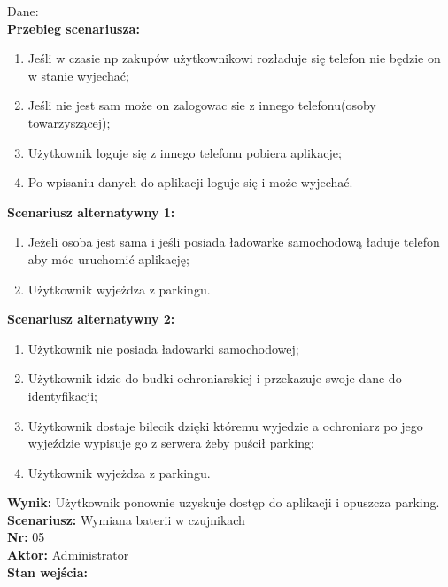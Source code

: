 \documentclass[12pt,a4paper]{article}
\begin{document}
Dane:
\\{\bf Przebieg scenariusza:}
\begin{enumerate}
\item Jeśli w czasie np zakupów użytkownikowi rozładuje się telefon nie będzie on w stanie wyjechać;
\item Jeśli nie jest sam może on zalogowac sie z innego telefonu(osoby towarzyszącej);
\item Użytkownik loguje się z innego telefonu pobiera aplikacje;
\item Po wpisaniu danych do aplikacji loguje się i może wyjechać.
\end{enumerate}
{\bf Scenariusz alternatywny 1:}
\begin{enumerate}
\item Jeżeli osoba jest sama i jeśli posiada ładowarke samochodową ładuje telefon aby móc uruchomić aplikację;
\item Użytkownik wyjeżdza z parkingu.
\end{enumerate}
{\bf Scenariusz alternatywny 2:}
\begin{enumerate}
\item Użytkownik nie posiada ładowarki samochodowej;
\item Użytkownik idzie do budki ochroniarskiej i przekazuje swoje dane do identyfikacji;
\item Użytkownik dostaje bilecik dzięki któremu wyjedzie a ochroniarz po jego wyjeździe wypisuje go z serwera żeby puścił parking;
\item Użytkownik wyjeżdza z parkingu.
\end{enumerate}
{\bf Wynik:} Użytkownik ponownie uzyskuje dostęp do aplikacji i opuszcza parking.
\newline\newline\newline\newline\newline\newline\newline\newline\newline\newline\newline\newline\newline\newline\newline
{\large \bf Scenariusz:} Wymiana baterii w czujnikach
\\{\bf Nr:} 05
\\{\bf Aktor:} Administrator
\\{\bf Stan wejścia:}
\end{document}
